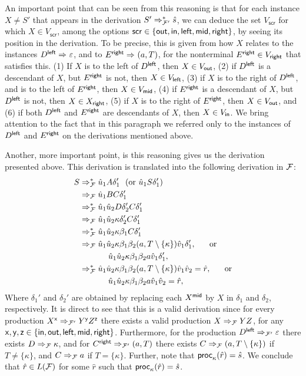 An important point that can be seen from this reasoning is that for each instance $X \neq S'$ that appears in the derivation $S'\Rightarrow_{\mathcal{F}'}^*\hat{s}$, we can deduce the set $V_{\mathsf{scr}}$ for which $X\in V_{\mathsf{scr}}$, among the options $\mathsf{scr}\in\{\mathsf{out}, \mathsf{in}, \mathsf{left}, \mathsf{mid}, \mathsf{right}\}$, by seeing its position in the derivation. To be precise, this is given from how $X$ relates to the instances $D^{\mathsf{left}}\Rightarrow_{}\varepsilon$, and to $E^{\mathsf{right}}\Rightarrow_{}(a, T)$, for the nonterminal $E^{\mathsf{right}}\in V_{\mathsf{right}}$ that satisfies this. (1) If $X$ is to the left of $D^{\mathsf{left}}$, then $X\in V_{\mathsf{out}}$, (2) if $D^{\mathsf{left}}$ is a descendant of $X$, but $E^{\mathsf{right}}$ is not, then $X\in V_{\mathsf{left}}$, (3) if $X$ is to the right of $D^{\mathsf{left}}$, and is to the left of $E^{\mathsf{right}}$, then $X\in V_{\mathsf{mid}}$, (4) if $E^{\mathsf{right}}$ is a descendant of $X$, but $D^{\mathsf{left}}$ is not, then $X\in X_{\mathsf{right}}$, (5) if $X$ is to the right of $E^{\mathsf{right}}$, then $X\in V_{\mathsf{out}}$, and (6) if both $D^{\mathsf{left}}$ and $E^{\mathsf{right}}$ are descendants of $X$, then $X\in V_{\mathsf{in}}$. We bring attention to the fact that in this paragraph we referred only to the instances of $D^{\mathsf{left}}$ and $E^{\mathsf{right}}$ on the derivations mentioned above.

Another, more important point, is this reasoning gives us the derivation presented above. This derivation is translated into the following derivation in $\mathcal{F}$:
\begin{align*}
	S  &\Rightarrow_{\mathcal{F}}^* 
	\hat{u}_1 A \delta_1'\ \  (\text{or } \hat{u}_1 S \delta_1')\\
	&\Rightarrow_{\mathcal{F}} 
	\hat{u}_1 BC\delta_1'\\
	&\Rightarrow_{\mathcal{F}}^* 
	\hat{u}_1 \hat{u}_2 D \delta_2' C \delta_1' \\
	&\Rightarrow_{\mathcal{F}}
	\hat{u}_1 \hat{u}_2 \kappa \delta_2' C\delta_1' \\
	&\Rightarrow_{\mathcal{F}}^* 
	\hat{u}_1 \hat{u}_2 \kappa \beta_1 C \delta_1' \\
	&\Rightarrow_{\mathcal{F}}
	\hat{u}_1 \hat{u}_2 \kappa \beta_1 \beta_2 (a, T\setminus\{\kappa\}) \hat{v}_1 \delta_1',\ \ \ \ \text{ or}\\
	&\ \ \ \ \ \ \ \ \ \, \, \,
	\hat{u}_1 \hat{u}_2 \kappa \beta_1 \beta_2 a \hat{v}_1 \delta_1',\\
	&\Rightarrow_{\mathcal{F}}^*
	\hat{u}_1 \hat{u}_2 \kappa \beta_1 \beta_2 (a, T\setminus\{\kappa\}) \hat{v}_1 \hat{v}_2 = \hat{r},\ \ \ \ \text{ or}\\
	&\ \ \ \ \ \ \ \ \ \, \, \,
	\hat{u}_1 \hat{u}_2 \kappa \beta_1 \beta_2 a \hat{v}_1 \hat{v}_2 = \hat{r},
\end{align*}
Where $\delta_1'$ and $\delta_2'$ are obtained by replacing each $X^{\mathsf{mid}}$ by $X$ in $\delta_1$ and $\delta_2$, respectively. It is direct to see that this is a valid derivation since for every production $X^\mathsf{x} \Rightarrow_{\mathcal{F}'} Y^\mathsf{y}  Z^\mathsf{z}$ there exists a valid production  $X \Rightarrow_{\mathcal{F}} Y Z$, for any $\mathsf{x}, \mathsf{y}, \mathsf{z}\in\{\mathsf{in}, \mathsf{out}, \mathsf{left}, \mathsf{mid}, \mathsf{right}\}$. Furthermore, for the production $D^{\mathsf{left}}\Rightarrow_{\mathcal{F}'}\varepsilon$ there exists $D\Rightarrow_{\mathcal{F}}\kappa$, and for $C^{\mathsf{right}}\Rightarrow_{\mathcal{F}'}(a, T)$ there exists $C\Rightarrow_{\mathcal{F}} (a, T\setminus\{\kappa\})$ if $T \neq \{\kappa\}$, and $C\Rightarrow_{\mathcal{F}} a$ if $T = \{\kappa\}$. Further, note that $\mathsf{proc}_\kappa(\hat{r}) = \hat{s}$. We conclude that $\hat{r}\in L(\mathcal{F})$ for some $\hat{r}$ such that $\mathsf{proc}_\kappa(\hat{r}) = \hat{s}$.\\


